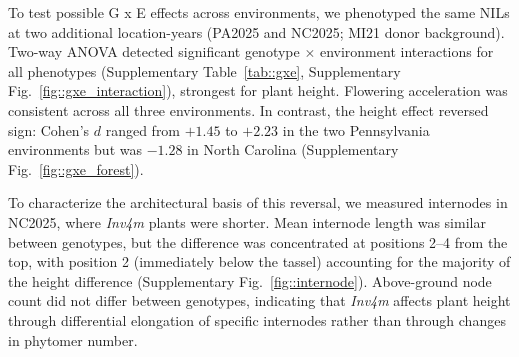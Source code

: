 \documentclass[9pt,twocolumn,twoside]{rilabRxiv}
\newcommand{\invfour}{\textit{Inv4m}\xspace}
\begin{document}
To test possible G x E effects across environments, we phenotyped the same NILs at two additional location-years (PA2025 and NC2025; MI21 donor background). Two-way ANOVA detected significant genotype $\times$ environment interactions for all phenotypes (Supplementary Table~\ref{tab::gxe}, Supplementary Fig.~\ref{fig::gxe_interaction}), strongest for plant height. 
Flowering acceleration was consistent across all three environments. 
In contrast, the height effect reversed sign: Cohen's $d$ ranged from $+1.45$ to $+2.23$ in the two Pennsylvania environments but was $-1.28$ in North Carolina (Supplementary Fig.~\ref{fig::gxe_forest}).

To characterize the architectural basis of this reversal, we measured internodes in NC2025, where \invfour plants were shorter. 
Mean internode length was similar between genotypes, but the difference was concentrated at positions 2--4 from the top, with position 2 (immediately below the tassel) accounting for the majority of the height difference (Supplementary Fig.~\ref{fig::internode}).
Above-ground node count did not differ between genotypes, indicating that \invfour affects plant height through differential elongation of specific internodes rather than through changes in phytomer number.


\end{document}

